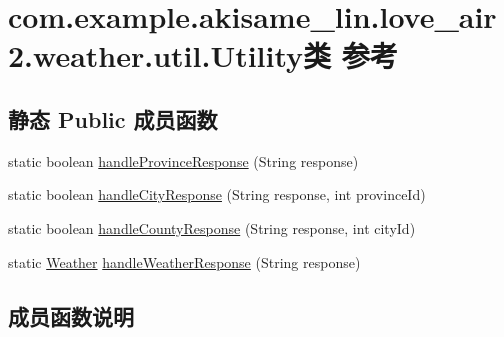 \hypertarget{classcom_1_1example_1_1akisame__lin_1_1love__air2_1_1weather_1_1util_1_1_utility}{}\section{com.\+example.\+akisame\+\_\+lin.\+love\+\_\+air2.\+weather.\+util.\+Utility类 参考}
\label{classcom_1_1example_1_1akisame__lin_1_1love__air2_1_1weather_1_1util_1_1_utility}
\subsection*{静态 Public 成员函数}
\begin{DoxyCompactItemize}
\item 
static boolean \mbox{\hyperlink{classcom_1_1example_1_1akisame__lin_1_1love__air2_1_1weather_1_1util_1_1_utility_aa9a3d4cb96c634c3c943c447061dc642}{handle\+Province\+Response}} (String response)
\item 
static boolean \mbox{\hyperlink{classcom_1_1example_1_1akisame__lin_1_1love__air2_1_1weather_1_1util_1_1_utility_aaf32ef3c1a67dcfe516f7d00fb22b1b8}{handle\+City\+Response}} (String response, int province\+Id)
\item 
static boolean \mbox{\hyperlink{classcom_1_1example_1_1akisame__lin_1_1love__air2_1_1weather_1_1util_1_1_utility_adcbceac496134d24f05c2714d54423b6}{handle\+County\+Response}} (String response, int city\+Id)
\item 
static \mbox{\hyperlink{classcom_1_1example_1_1akisame__lin_1_1love__air2_1_1weather_1_1gson_1_1_weather}{Weather}} \mbox{\hyperlink{classcom_1_1example_1_1akisame__lin_1_1love__air2_1_1weather_1_1util_1_1_utility_a67f669cea8b9ab2629d9ea6659b99ffd}{handle\+Weather\+Response}} (String response)
\end{DoxyCompactItemize}


\subsection{成员函数说明}
\mbox{\label{classcom_1_1example_1_1akisame__lin_1_1love__air2_1_1weather_1_1util_1_1_utility_aaf32ef3c1a67dcfe516f7d00fb22b1b8}} 
